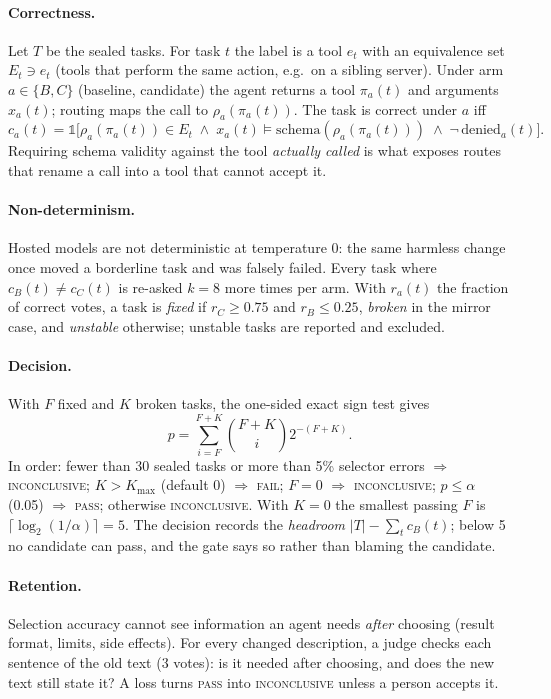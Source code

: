 \documentclass[11pt]{article}
\newcommand{\pass}{\textsc{pass}}
\newcommand{\fail}{\textsc{fail}}
\newcommand{\incon}{\textsc{inconclusive}}
\begin{document}
\paragraph{Correctness.} Let $T$ be the sealed tasks. For task $t$ the label is a tool $e_t$ with an equivalence set $E_t \ni e_t$
(tools that perform the same action, e.g.\ on a sibling server). Under arm $a\in\{B,C\}$ (baseline, candidate) the agent returns a
tool $\pi_a(t)$ and arguments $x_a(t)$; routing maps the call to $\rho_a(\pi_a(t))$. The task is correct under $a$ iff
\begin{equation}
c_a(t) = \mathbb{1}\big[\rho_a(\pi_a(t)) \in E_t \;\wedge\; x_a(t) \models \mathrm{schema}(\rho_a(\pi_a(t))) \;\wedge\; \neg\,\mathrm{denied}_a(t)\big].
\end{equation}
Requiring schema validity against the tool \emph{actually called} is what exposes routes that rename a call into a tool that
cannot accept it.

\paragraph{Non-determinism.} Hosted models are not deterministic at temperature 0: the same harmless change once moved a
borderline task and was falsely failed. Every task where $c_B(t)\neq c_C(t)$ is re-asked $k=8$ more times per arm. With $r_a(t)$
the fraction of correct votes, a task is \emph{fixed} if $r_C\ge 0.75$ and $r_B\le 0.25$, \emph{broken} in the mirror case, and
\emph{unstable} otherwise; unstable tasks are reported and excluded.

\paragraph{Decision.} With $F$ fixed and $K$ broken tasks, the one-sided exact sign test gives
\begin{equation}
p = \sum_{i=F}^{F+K} \binom{F+K}{i} 2^{-(F+K)}.
\end{equation}
In order: fewer than 30 sealed tasks or more than 5\% selector errors $\Rightarrow$ \incon; $K>K_{\max}$ (default 0) $\Rightarrow$
\fail; $F=0$ $\Rightarrow$ \incon; $p\le\alpha$ (0.05) $\Rightarrow$ \pass; otherwise \incon. With $K=0$ the smallest passing $F$
is $\lceil\log_2(1/\alpha)\rceil = 5$. The decision records the \emph{headroom} $|T|-\sum_t c_B(t)$; below 5 no candidate can pass,
and the gate says so rather than blaming the candidate.

\paragraph{Retention.} Selection accuracy cannot see information an agent needs \emph{after} choosing (result format, limits,
side effects). For every changed description, a judge checks each sentence of the old text (3 votes): is it needed after
choosing, and does the new text still state it? A loss turns \pass{} into \incon{} unless a person accepts it.
\end{document}
